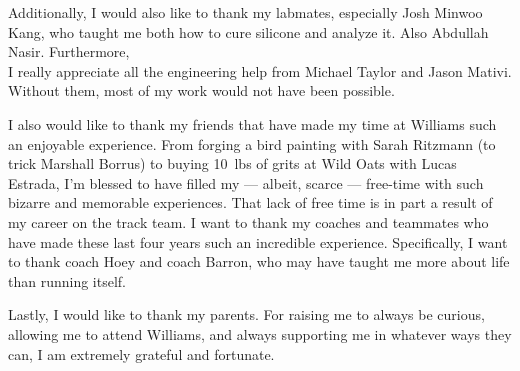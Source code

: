 Additionally, I would also like to thank my labmates, especially Josh Minwoo Kang, who taught me both how to cure silicone and analyze it. Also Abdullah Nasir. Furthermore,\\ I really appreciate all the engineering help from Michael Taylor and Jason Mativi. Without them, most of my work would not have been possible. 

I also would like to thank my friends that have made my time at Williams such an enjoyable experience. From forging a bird painting with Sarah Ritzmann (to trick Marshall Borrus) to buying 10~lbs of grits at Wild Oats with Lucas Estrada, I'm blessed to have filled my --- albeit, scarce --- free-time with such bizarre and memorable experiences. That lack of free time is in part a result of my career on the track team. I want to thank my coaches and teammates who have made these last four years such an incredible experience. Specifically, I want to thank coach Hoey and coach Barron, who may have taught me more about life than running itself. 

Lastly, I would like to thank my parents. For raising me to always be curious, allowing me to attend Williams, and always supporting me in whatever ways they can, I am extremely grateful and fortunate. 
